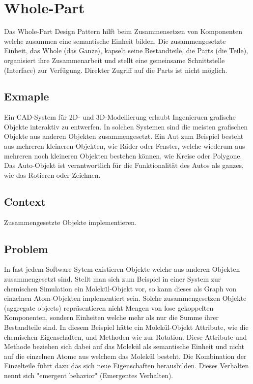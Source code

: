 \section{Whole-Part}


Das Whole-Part Design Pattern hilft beim Zusammensetzen von Komponenten welche zusammen eine semantische Einheit bilden. Die zusammengesetzte Einheit, das Whole (das Ganze), kapselt seine Bestandteile, die Parts (die Teile), organisiert ihre Zusammenarbeit und stellt eine gemeinsame Schnittstelle (Interface) zur Verfügung. Direkter Zugriff auf die Parts ist nicht möglich.

\subsection*{Exmaple}


Ein CAD-System für 2D- und 3D-Modellierung erlaubt Ingenieruen grafische Objekte interaktiv zu entwerfen. In solchen Systemen sind die meisten grafischen Objekte aus anderen Objekten zusammengesetzt. Ein Aut zum Beispiel besteht aus mehreren kleineren Objekten, wie Räder oder Fenster, welche wiederum aus mehreren noch kleineren Objekten bestehen können, wie Kreise oder Polygone. Das Auto-Objekt ist verantwortlich für die Funktionalität des Autos als ganzes, wie das Rotieren oder Zeichnen.

\subsection*{Context}


Zusammengesetzte Objekte implementieren.

\subsection*{Problem}


In fast jedem Software Sytem existieren Objekte welche aus anderen Objekten zusammengesetzt sind. Stellt man sich zum Beispiel in einer System zur chemischen Simulation ein Molekül-Objekt vor, so kann dieses als Graph von einzelnen Atom-Objekten implementiert sein. Solche zusammengesetzen Objekte (aggregate objects) repräsentieren nicht Mengen von lose gekoppelten Komponenten, sondern Einheiten welche mehr als nur die Summe ihrer Bestandteile sind. In diesem Beispiel hätte ein Molekül-Objekt Attribute, wie die chemischen Eigenschaften, und Methoden wie zur Rotation. Diese Attribute und Methode beziehen sich dabei auf das Molekül als semantische Einheit und nicht auf die einzelnen Atome aus welchem das Molekül besteht. Die Kombination der Einzelteile führt dazu das sich neue Eigenschaften herausbilden. Dieses Verhalten nennt sich "emergent behavior" (Emergentes Verhalten).


